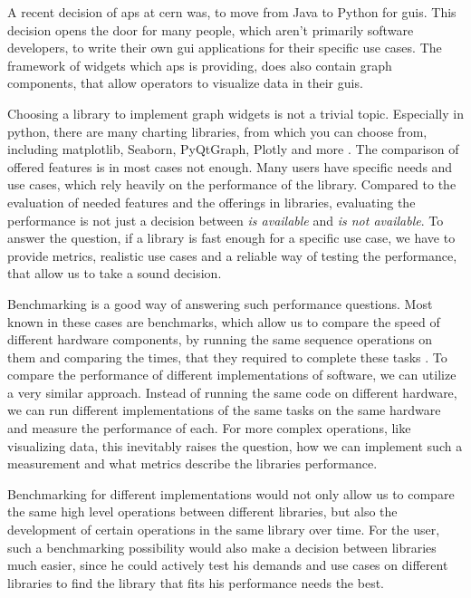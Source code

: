 A recent decision of \gls{aps} at \gls{cern} was, to move from Java to Python
for \glspl{gui}. This decision opens the door for many people, which aren't
primarily software developers, to write their own \gls{gui} applications for
their specific use cases. The framework of widgets which \gls{aps} is providing,
does also contain graph components, that allow operators to visualize data in
their \glspl{gui}.

Choosing a library to implement graph widgets is not a trivial topic. Especially
in python, there are many charting libraries, from which you can choose from,
including matplotlib, Seaborn, PyQtGraph, Plotly and more \cite{PyDataVisLibs}.
The comparison of offered features is in most cases not enough. Many users have
specific needs and use cases, which rely heavily on the performance of the
library. Compared to the evaluation of needed features and the offerings in
libraries, evaluating the performance is not just a decision between \emph{is
available} and \emph{is not available}. To answer the question, if a library is
fast enough for a specific use case, we have to provide metrics, realistic use
cases and a reliable way of testing the performance, that allow us to take a
sound decision.

Benchmarking is a good way of answering such performance questions. Most known
in these cases are benchmarks, which allow us to compare the speed of different
hardware components, by running the same sequence operations on them and
comparing the times, that they required to complete these tasks
\cite{OverviewBenchmarks}. To compare the performance of different
implementations of software, we can utilize a very similar approach. Instead of
running the same code on different hardware, we can run different
implementations of the same tasks on the same hardware and measure the
performance of each. For more complex operations, like visualizing data, this inevitably
raises the question, how we can implement such a measurement and what metrics
describe the libraries performance.

Benchmarking for different implementations would not only allow us to compare
the same high level operations between different libraries, but also the
development of certain operations in the same library over time. For the user,
such a benchmarking possibility would also make a decision between libraries
much easier, since he could actively test his demands and use cases on different
libraries to find the library that fits his performance needs the best.




